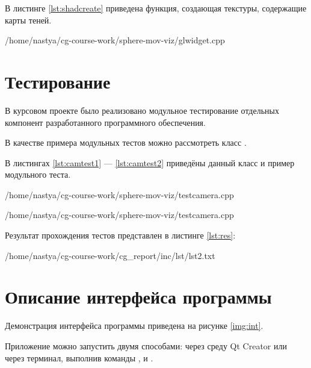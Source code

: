 В листинге \ref{lst:shadcreate} приведена функция, создающая текстуры, содержащие карты теней.

\begin{lstinputlisting}[
	caption={Создание текстур карт теней},
	label={lst:shadcreate},
	style={cpp},
	linerange={74-92},
	]{/home/nastya/cg-course-work/sphere-mov-viz/glwidget.cpp}
\end{lstinputlisting}

\section{Тестирование}

В курсовом проекте было реализовано модульное тестирование отдельных компонент разработанного программного обеспечения. 

В качестве примера модульных тестов можно рассмотреть класс .

В листингах \ref{lst:camtest1} --- \ref{lst:camtest2} приведёны данный класс и пример модульного теста.

\begin{lstinputlisting}[
	caption={Класс, тестирующий камеру},
	label={lst:camtest1},
	style={cpp},
	linerange={5-17},
	]{/home/nastya/cg-course-work/sphere-mov-viz/testcamera.cpp}
\end{lstinputlisting}

\begin{lstinputlisting}[
	caption={Пример теста},
	label={lst:camtest2},
	style={cpp},
	linerange={38-45},
	]{/home/nastya/cg-course-work/sphere-mov-viz/testcamera.cpp}
\end{lstinputlisting}

Результат прохождения тестов представлен в листинге \ref{lst:res}:
\pagebreak
\begin{lstinputlisting}[
	caption={Результат прохождения тестов},
	label={lst:res},
	style={cpp},
	]{/home/nastya/cg-course-work/cg_report/inc/lst/lst2.txt}
\end{lstinputlisting}

\section{Описание интерфейса программы}

Демонстрация интерфейса программы приведена на рисунке \ref{img:int}.


Приложение можно запустить двумя способами: через среду Qt Creator или через терминал, выполнив команды ,  и .

